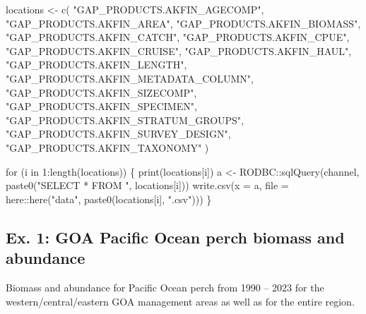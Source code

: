 \documentclass[
  letterpaper,
  oneside,
  open=any]{scrbook}
\newenvironment{Shaded}{\begin{snugshade}}{\end{snugshade}}
\newcommand{\AttributeTok}[1]{\textcolor[rgb]{0.40,0.45,0.13}{#1}}
\newcommand{\ControlFlowTok}[1]{\textcolor[rgb]{0.00,0.23,0.31}{#1}}
\newcommand{\DecValTok}[1]{\textcolor[rgb]{0.68,0.00,0.00}{#1}}
\newcommand{\FunctionTok}[1]{\textcolor[rgb]{0.28,0.35,0.67}{#1}}
\newcommand{\NormalTok}[1]{\textcolor[rgb]{0.00,0.23,0.31}{#1}}
\newcommand{\OtherTok}[1]{\textcolor[rgb]{0.00,0.23,0.31}{#1}}
\newcommand{\SpecialCharTok}[1]{\textcolor[rgb]{0.37,0.37,0.37}{#1}}
\newcommand{\StringTok}[1]{\textcolor[rgb]{0.13,0.47,0.30}{#1}}
\begin{document}
\begin{Shaded}
\begin{Highlighting}[]
\NormalTok{locations }\OtherTok{\textless{}{-}} \FunctionTok{c}\NormalTok{(}
  \StringTok{"GAP\_PRODUCTS.AKFIN\_AGECOMP"}\NormalTok{, }
  \StringTok{"GAP\_PRODUCTS.AKFIN\_AREA"}\NormalTok{, }
  \StringTok{"GAP\_PRODUCTS.AKFIN\_BIOMASS"}\NormalTok{, }
  \StringTok{"GAP\_PRODUCTS.AKFIN\_CATCH"}\NormalTok{, }
  \StringTok{"GAP\_PRODUCTS.AKFIN\_CPUE"}\NormalTok{, }
  \StringTok{"GAP\_PRODUCTS.AKFIN\_CRUISE"}\NormalTok{, }
  \StringTok{"GAP\_PRODUCTS.AKFIN\_HAUL"}\NormalTok{, }
  \StringTok{"GAP\_PRODUCTS.AKFIN\_LENGTH"}\NormalTok{, }
  \StringTok{"GAP\_PRODUCTS.AKFIN\_METADATA\_COLUMN"}\NormalTok{, }
  \StringTok{"GAP\_PRODUCTS.AKFIN\_SIZECOMP"}\NormalTok{, }
  \StringTok{"GAP\_PRODUCTS.AKFIN\_SPECIMEN"}\NormalTok{, }
  \StringTok{"GAP\_PRODUCTS.AKFIN\_STRATUM\_GROUPS"}\NormalTok{, }
  \StringTok{"GAP\_PRODUCTS.AKFIN\_SURVEY\_DESIGN"}\NormalTok{, }
  \StringTok{"GAP\_PRODUCTS.AKFIN\_TAXONOMY"}
\NormalTok{)}

\ControlFlowTok{for}\NormalTok{ (i }\ControlFlowTok{in} \DecValTok{1}\SpecialCharTok{:}\FunctionTok{length}\NormalTok{(locations)) \{}
  \FunctionTok{print}\NormalTok{(locations[i])}
\NormalTok{  a }\OtherTok{\textless{}{-}}\NormalTok{ RODBC}\SpecialCharTok{::}\FunctionTok{sqlQuery}\NormalTok{(channel, }\FunctionTok{paste0}\NormalTok{(}\StringTok{"SELECT * FROM "}\NormalTok{, locations[i]))}
  \FunctionTok{write.csv}\NormalTok{(}\AttributeTok{x =}\NormalTok{ a, }\AttributeTok{file =}\NormalTok{ here}\SpecialCharTok{::}\FunctionTok{here}\NormalTok{(}\StringTok{"data"}\NormalTok{, }\FunctionTok{paste0}\NormalTok{(locations[i], }\StringTok{".csv"}\NormalTok{)))}
\NormalTok{\}}
\end{Highlighting}
\end{Shaded}

\hypertarget{ex.-1-goa-pacific-ocean-perch-biomass-and-abundance}{%
\subsection{Ex. 1: GOA Pacific Ocean perch biomass and
abundance}\label{ex.-1-goa-pacific-ocean-perch-biomass-and-abundance}}

Biomass and abundance for Pacific Ocean perch from 1990 -- 2023 for the
western/central/eastern GOA management areas as well as for the entire
region.
\end{document}

